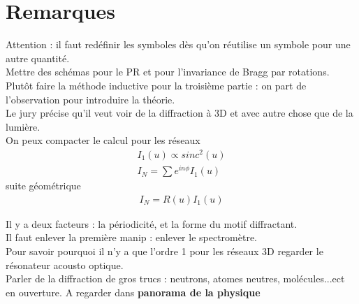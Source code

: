 \documentclass[12pt,prb,aps,epsf]{article}
\begin{document}
\section*{Remarques}
Attention : il faut redéfinir les symboles dès qu'on réutilise un symbole pour une autre quantité.\\
Mettre des schémas pour le PR et pour l'invariance de Bragg par rotations.\\
Plutôt faire la méthode inductive pour la troisième partie : on part de l'observation pour introduire la théorie.\\
Le jury précise qu'il veut voir de la diffraction à 3D et avec autre chose que de la lumière.\\
On peux compacter le calcul pour les réseaux 
\begin{eqnarray}
I_1(u) \propto sinc^2(u)\\
I_N = \sum e^{in\phi}I_1(u)
\end{eqnarray}
suite géométrique 
\begin{eqnarray}
I_N = R(u)I_1(u)
\end{eqnarray}

Il y a deux facteurs : la périodicité, et la forme du motif diffractant.\\

Il faut enlever la première manip : enlever le spectromètre.\\

Pour savoir pourquoi il n'y a que l'ordre 1 pour les réseaux 3D regarder le résonateur acousto optique.\\

Parler de la diffraction de gros trucs : neutrons, atomes neutres, molécules...ect en ouverture. A regarder dans \textbf{panorama de la physique}
\end{document}
